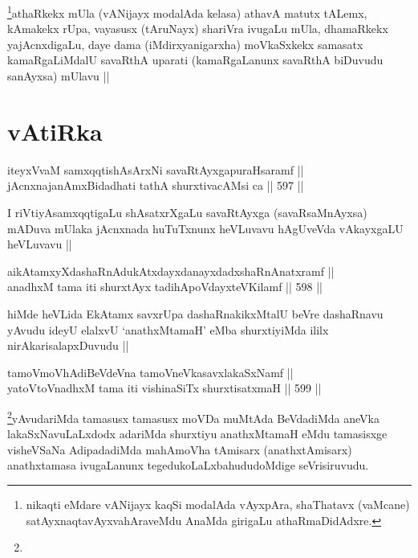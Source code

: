 \begin{artha}
\footnote{nikaqti eMdare vANijayx kaqSi modalAda vAyxpAra, shaThatavx
  (vaMcane) satAyxnaqtavAyxvahAraveMdu AnaMda girigaLu athaRmaDidAdxre.}athaRkekx mUla (vANijayx modalAda kelasa) athavA matutx
tALemx, kAmakekx rUpa, vayasusx (tAruNayx) shariVra ivugaLu mUla,
dhamaRkekx yajAcnxdigaLu, daye dama (iMdirxyanigarxha) moVkaSxkekx
samasatx kamaRgaLiMdalU savaRthA uparati (kamaRgaLanunx savaRthA
biDuvudu sanAyxsa) mUlavu ||
\end{artha}

\section*{vAtiRka}

\begin{shl}
iteyxVvaM samxqqtishAsArxNi savaRtAyxgapuraHsaramf || \\
jAcnxnajanAmxBidadhati tathA shurxtivacAMsi ca ||  597 ||  
\end{shl}

\begin{artha}
I riVtiyAsamxqqtigaLu shAsatxrXgaLu savaRtAyxga (savaRsaMnAyxsa)
mADuva mUlaka jAcnxnada huTuTxnunx heVLuvavu hAgUveVda vAkayxgaLU
heVLuvavu ||
\end{artha}

\begin{shl}
aikAtamxyXdashaRnAdukAtxdayxdanayxdadxshaRnAnatxramf || \\
anadhxM tama iti shurxtAyx tadihApoVdayxteV\s Kilamf ||  598 ||  
\end{shl}

\begin{artha}
hiMde heVLida EkAtamx savxrUpa dashaRnakikxMtalU beVre dashaRnavu
yAvudu ideyU elalxvU `anathxMtamaH' eMba shurxtiyiMda ililx
nirAkarisalapxDuvudu ||
\end{artha}


\begin{shl}
tamoVmoVhAdiBeVdeVna tamoV\s neVkasavxlakaSxNamf || \\
yatoV\s toV\s nadhxM tama iti vishinaSiTx shurxtisatxmaH ||  599 ||  
\end{shl}

\begin{artha}
\footnote{}yAvudariMda tamasusx tamasusx moVDa muMtAda BeVdadiMda
aneVka lakaSxNavuLaLxdodx adariMda shurxtiyu anathxMtamaH eMdu
tamasisxge visheVSaNa AdipadadiMda mahAmoVha tAmisarx (anathxtAmisarx)
anathxtamasa ivugaLanunx tegedukoLaLxbahududoMdige seVrisiruvudu.
\end{artha}

